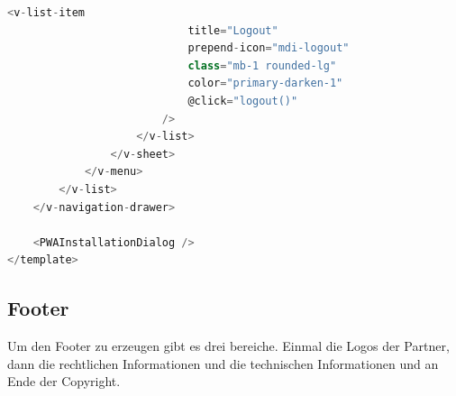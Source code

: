 \begin{lstlisting}[language={JavaScript}, caption={Navigationsleiste für Web als auch Mobile}]
                        <v-list-item
                            title="Logout"
                            prepend-icon="mdi-logout"
                            class="mb-1 rounded-lg"
                            color="primary-darken-1"
                            @click="logout()"
                        />
                    </v-list>
                </v-sheet>
            </v-menu>
        </v-list>
    </v-navigation-drawer>

    <PWAInstallationDialog />
</template>
\end{lstlisting}

\subsection{Footer}

Um den Footer zu erzeugen gibt es drei bereiche. Einmal die Logos der Partner, dann die rechtlichen Informationen und die technischen Informationen und an Ende der Copyright.

